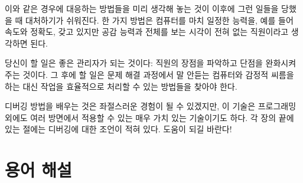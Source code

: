 \documentclass[10pt]{book}
\begin{document}
이와 같은 경우에 대응하는 방법들을 미리 생각해 놓는 것이 이후에 그런
일들을 당했을 때 대처하기가 쉬워진다.  한 가지 방법은 컴퓨터를 마치
일정한 능력을, 예를 들어 속도와 정확도, 갖고 있지만 공감 능력과 전체를
보는 시각이 전혀 없는 직원이라고 생각하면 된다.

당신이 할 일은 좋은 관리자가 되는 것이다: 직원의 장점을 파악하고 단점을
완화시켜주는 것이다.  그 후에 할 일은 문제 해결 과정에서 말 안듣는
컴퓨터와 감정적 씨름을 하는 대신 작업을 효율적으로 처리할 수 있는
방법들을 찾아야 한다.

디버깅 방법을 배우는 것은 좌절스러운 경험이 될 수 있겠지만, 이 기술은
프로그래밍 외에도 여러 방면에서 적용할 수 있는 매우 가치 있는
기술이기도 하다.  각 장의 끝에 있는 절에는 디버깅에 대한 조언이 적혀
있다.  도움이 되길 바란다!


\section{용어 해설}
\end{document}
